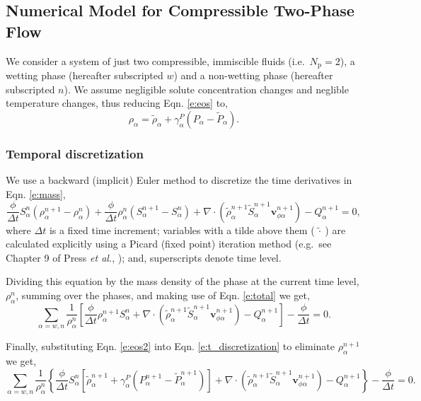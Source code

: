 \subsection{Numerical Model for Compressible Two-Phase Flow}

We consider a system of just two compressible, immiscible fluids (i.e.\ $N_\mathrm{p} = 2$), a wetting phase (hereafter subscripted $w$) and a non-wetting phase (hereafter subscripted $n$).  We assume negligible solute concentration changes and neglible temperature changes, thus reducing  Eqn. \ref{e:eos} to,
\begin{equation}\label{e:eos2}
\rho_\alpha = \tilde{\rho}_\alpha + \gamma_\alpha^P (P_\alpha - \tilde{P}_\alpha).
\end{equation}

\subsubsection{Temporal discretization}\label{s:t_discretization}

We use a backward (implicit) Euler method to discretize the time derivatives in Eqn. \ref{e:mass},
\begin{equation}
\frac{\phi}{\Delta t} S^n_\alpha \left( \rho^{n+1}_\alpha-\rho^n_\alpha \right) + \frac{\phi}{\Delta t} \rho^n_\alpha \left( S^{n+1}_\alpha-S^n_\alpha \right) + \nabla \cdot \left( \tilde{\rho}^{n+1}_\alpha \tilde{S}^{n+1}_\alpha \mathbf{v}^{n+1}_{\phi \alpha} \right) - Q^{n+1}_\alpha = 0,
\end{equation}
where $\Delta t$ is a fixed time increment; variables with a tilde above them ($\tilde{\ \cdot\ }$) are calculated explicitly using a Picard (fixed point) iteration method (e.g.\ see Chapter 9 of Press \textit{et al.}, \cite{press_2008}); and, superscripts denote time level.

Dividing this equation by the mass density of the phase at the current time level, $\rho^n_\alpha$, summing over the phases, and making use of Eqn. \ref{e:total} we get,
\begin{equation}\label{e:t_discretization}
\sum_{\alpha = w,n} \frac{1}{\rho^n_\alpha} \left[ \frac{\phi}{\Delta t} \rho^{n+1}_\alpha S^n_\alpha + \nabla \cdot \left( \tilde{\rho}^{n+1}_\alpha \tilde{S}^{n+1}_\alpha \mathbf{v}^{n+1}_{\phi \alpha} \right) - Q^{n+1}_\alpha \right] - \frac{\phi}{\Delta t} = 0.
\end{equation}

Finally, substituting Eqn. \ref{e:eos2} into Eqn. \ref{e:t_discretization} to eliminate $\rho^{n+1}_\alpha$ we get,
\begin{equation}\label{e:cty}
\sum_{\alpha = w,n} \frac{1}{\rho^n_\alpha} \left\{ \frac{\phi}{\Delta t} S^n_\alpha \left[ \tilde{\rho}^{n+1}_\alpha + \gamma_\alpha^P \left( P^{n+1}_\alpha - \tilde{P}^{n+1}_\alpha \right) \right] + \nabla \cdot \left( \tilde{\rho}^{n+1}_\alpha \tilde{S}^{n+1}_\alpha \mathbf{v}^{n+1}_{\phi \alpha} \right) - Q^{n+1}_\alpha \right\} - \frac{\phi}{\Delta t} = 0.
\end{equation}

